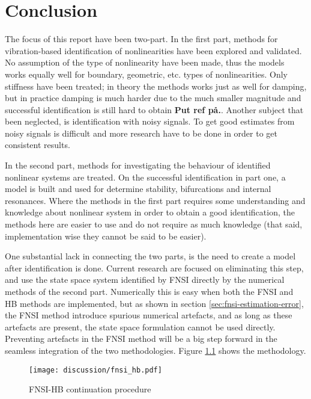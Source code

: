 \chapter{Conclusion}
\label{cha:conclusion}

The focus of this report have been two-part. In the first part, methods for
vibration-based identification of nonlinearities have been explored and
validated. No assumption of the type of nonlinearity have been made, thus the
models works equally well for boundary, geometric, etc. types of nonlinearities.
Only stiffness have been treated; in theory the methods works just as well for
damping, but in practice damping is much harder due to the much smaller
magnitude and successful identification is still hard to obtain \textbf{Put ref
  på.}. Another subject that been neglected, is identification with noisy
signals. To get good estimates from noisy signals is difficult and more research
have to be done in order to get consistent results.

In the second part, methods for investigating the behaviour of identified
nonlinear systems are treated. On the successful identification in part one, a
model is built and used for determine stability, bifurcations and internal
resonances. Where the methods in the first part requires some understanding and
knowledge about nonlinear system in order to obtain a good identification, the
methods here are easier to use and do not require as much knowledge (that said,
implementation wise they cannot be said to be easier).

One substantial lack in connecting the two parts, is the need to create a model
after identification is done. Current research are focused on eliminating this
step, and use the state space system identified by FNSI directly by the
numerical methods of the second part\autocite{gourc2016a}. Numerically this is
easy when both the FNSI and HB methods are implemented, but as shown in section
\ref{sec:fnsi-estimation-error}, the FNSI method introduce spurious numerical
artefacts, and as long as these artefacts are present, the state space
formulation cannot be used directly. Preventing artefacts in the FNSI method
will be a big step forward in the seamless integration of the two methodologies.
Figure \ref{fig:fnsi_hb} shows the methodology.

\begin{figure}[!ht]
  \centering
  \texttt{[image: discussion/fnsi\_hb.pdf]}
  \caption{FNSI-HB continuation procedure}
  \label{fig:fnsi_hb}
 \end{figure}



